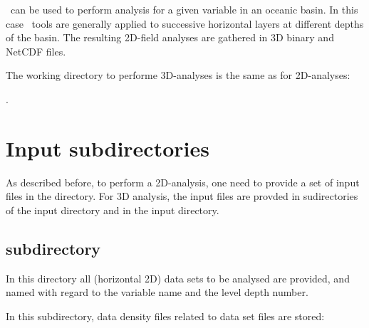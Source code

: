 
\diva\  can be used to perform analysis  for a given variable in an oceanic basin. In this case \diva\  tools are generally applied to successive horizontal layers at different depths of the basin. The resulting 2D-field analyses are gathered in 3D binary and NetCDF files.

The working directory to performe 3D-analyses is the same as for 2D-analyses:\par {}.


\section{Input subdirectories}

As described before, to perform a 2D-analysis, one need to provide a set of input files in the   directory. For 3D analysis, the input files are provded in sudirectories of the input directory and in the input directory.

\subsection[DIVA3D/divastripped/input/divadata directory]{ subdirectory}

In this directory all (horizontal 2D) data sets to be analysed are provided, and named with regard to the variable name and the level depth number.


\begin{center}
\end{center}

In this subdirectory, data density files related to data set files are stored:

